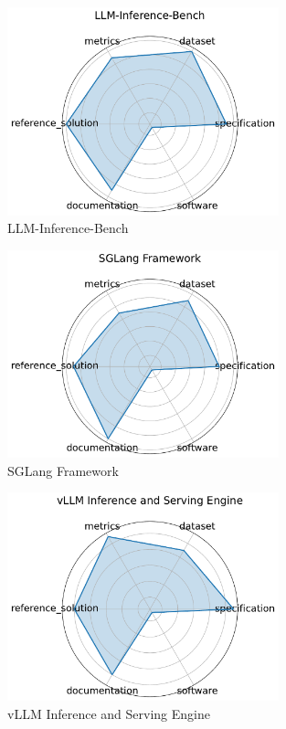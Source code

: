 \documentclass{article}
\begin{document}
\begin{figure}[h!]
  \centering
  \includegraphics[width=0.7\textwidth]{LLM-Inference-Bench_radar.pdf}
  \caption{LLM-Inference-Bench \cite{chittyvenkata2024llminferencebenchinferencebenchmarkinglarge}}
\end{figure}

\begin{figure}[h!]
  \centering
  \includegraphics[width=0.7\textwidth]{SGLang Framework_radar.pdf}
  \caption{SGLang Framework \cite{zheng2024sglangefficientexecutionstructured}}
\end{figure}

\begin{figure}[h!]
  \centering
  \includegraphics[width=0.7\textwidth]{vLLM Inference and Serving Engine_radar.pdf}
  \caption{vLLM Inference and Serving Engine \cite{kwon2023efficient}}
\end{figure}
\end{document}
